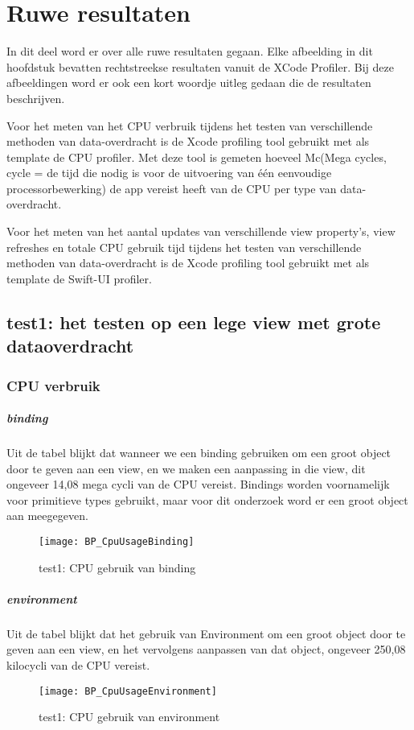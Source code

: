 \chapter{Ruwe resultaten}%
\label{ch:ruweresultaten}
In dit deel word er over alle ruwe resultaten gegaan. Elke afbeelding in dit hoofdstuk bevatten rechtstreekse resultaten vanuit de XCode Profiler. Bij deze afbeeldingen word er ook een kort woordje uitleg gedaan die de resultaten beschrijven.

Voor het meten van het CPU verbruik tijdens het testen van verschillende methoden van data-overdracht is de Xcode profiling tool gebruikt met als template de CPU profiler. Met deze tool is gemeten hoeveel Mc(Mega cycles, cycle = 
de tijd die nodig is voor de uitvoering van één eenvoudige processorbewerking) de app vereist heeft van de CPU per type van data-overdracht. 

Voor het meten van het aantal updates van verschillende view property's, view refreshes en totale CPU gebruik tijd tijdens het testen van verschillende methoden van data-overdracht is de Xcode profiling tool gebruikt met als template de Swift-UI profiler. 

\section{test1: het testen op een lege view met grote dataoverdracht}
\subsection{CPU verbruik}

\paragraph{binding}
Uit de tabel blijkt dat wanneer we een binding gebruiken om een groot object door te geven aan een view, en we maken een aanpassing in die view, dit ongeveer 14,08 mega cycli van de CPU vereist. Bindings worden voornamelijk voor primitieve types gebruikt, maar voor dit onderzoek word er een groot object aan meegegeven.
\begin{figure}[H]
    \centering
    \texttt{[image: BP\_CpuUsageBinding]} 
    \caption{test1: CPU gebruik van binding}
    \label{fig:cpuBinding}
\end{figure}

\paragraph{environment}
Uit de tabel blijkt dat het gebruik van Environment om een groot object door te geven aan een view, en het vervolgens aanpassen van dat object, ongeveer 250,08 kilocycli van de CPU vereist.
\begin{figure}[H]
    \centering
    \texttt{[image: BP\_CpuUsageEnvironment]} 
    \caption{test1: CPU gebruik van environment}
    \label{fig:cpuEnvironment}
\end{figure}

